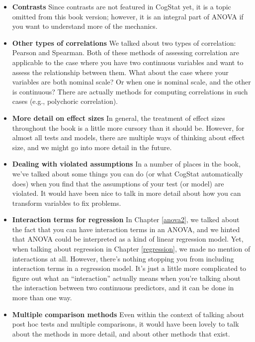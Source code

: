 \documentclass[
]{book}
\providecommand{\tightlist}{%
  \setlength{\itemsep}{0pt}\setlength{\parskip}{0pt}}
\theoremstyle{definition}
\theoremstyle{definition}
\theoremstyle{definition}
\theoremstyle{definition}
\theoremstyle{remark}
\begin{document}
\begin{itemize}
\tightlist
\item
  \textbf{Contrasts} Since contrasts are not featured in CogStat yet, it is a topic omitted from this book version; however, it is an integral part of ANOVA if you want to understand more of the mechanics.
\item
  \textbf{Other types of correlations} We talked about two types of correlation: Pearson and Spearman. Both of these methods of assessing correlation are applicable to the case where you have two continuous variables and want to assess the relationship between them. What about the case where your variables are both nominal scale? Or when one is nominal scale, and the other is continuous? There are actually methods for computing correlations in such cases (e.g., polychoric correlation).
\item
  \textbf{More detail on effect sizes} In general, the treatment of effect sizes throughout the book is a little more cursory than it should be. However, for almost all tests and models, there are multiple ways of thinking about effect size, and we might go into more detail in the future.
\item
  \textbf{Dealing with violated assumptions} In a number of places in the book, we've talked about some things you can do (or what CogStat automatically does) when you find that the assumptions of your test (or model) are violated. It would have been nice to talk in more detail about how you can transform variables to fix problems.
\item
  \textbf{Interaction terms for regression} In Chapter \ref{anova2}, we talked about the fact that you can have interaction terms in an ANOVA, and we hinted that ANOVA could be interpreted as a kind of linear regression model. Yet, when talking about regression in Chapter \ref{regression}, we made no mention of interactions at all. However, there's nothing stopping you from including interaction terms in a regression model. It's just a little more complicated to figure out what an ``interaction'' actually means when you're talking about the interaction between two continuous predictors, and it can be done in more than one way.
\item
  \textbf{Multiple comparison methods} Even within the context of talking about post hoc tests and multiple comparisons, it would have been lovely to talk about the methods in more detail, and about other methods that exist.
\end{itemize}
\end{document}
